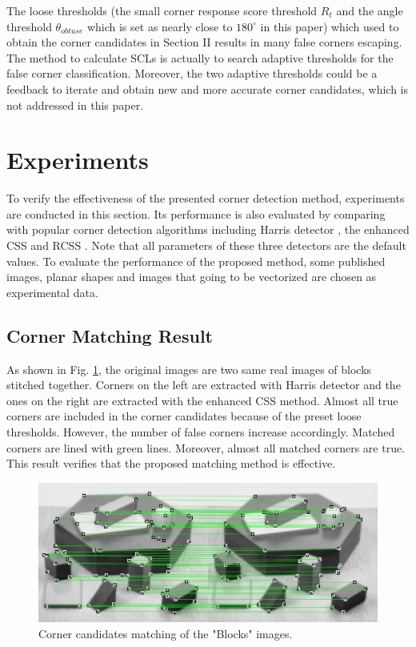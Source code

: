 \documentclass[letterpaper, 10 pt, conference]{ieeeconf}  %
\begin{document}
The loose thresholds (the small corner response score threshold ${R _ { t }}$ and the angle threshold ${\theta _ {obtuse} }$ which is set as nearly close to $180 ^ { \circ }$ in this paper) which used to obtain the corner candidates in Section II results in many false corners escaping. The method to calculate SCLs is actually to search adaptive thresholds for the false corner classification. Moreover, the two adaptive thresholds could be a feedback to iterate and obtain new and more accurate corner candidates, which is not addressed in this paper.

\section{Experiments}
To verify the effectiveness of the presented corner detection method, experiments are conducted in this section. Its performance is also evaluated by comparing with popular corner detection algorithms including Harris detector \cite{Harris1988A}, the enhanced CSS \cite{He2008Corner} and RCSS \cite{Topal2013A}. Note that all parameters of these three detectors are the default values. To evaluate the performance of the proposed method, some published images, planar shapes and images that going to be vectorized are chosen as experimental data.

\subsection{Corner Matching Result}
As shown in Fig. \ref{Corner matching show}, the original images are two same real images of blocks stitched together. Corners on the left are extracted with Harris detector and the ones on the right are extracted with the enhanced CSS method. Almost all true corners are included in the corner candidates because of the preset loose thresholds. However, the number of false corners increase accordingly. Matched corners are lined with green lines. Moreover, almost all matched corners are true. This result verifies that the proposed matching method is effective. 
\begin{figure}[htbp]
\centering
\includegraphics[width=\linewidth]{experiments/blocks_corner_matching.png}
\caption{Corner candidates matching of the "Blocks" images.} 
\label{Corner matching show}
\end{figure}
\end{document}
